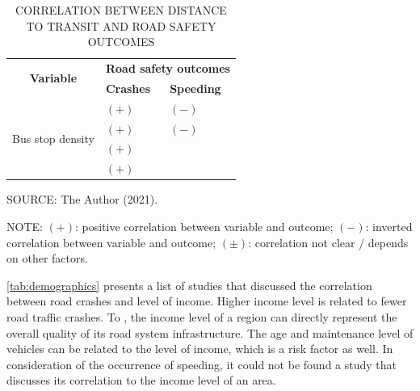 \begin{table}[!hbtp]
    \footnotesize
    \captionsetup{justification=raggedright,
        singlelinecheck=false,
        font=footnotesize}
    \caption{CORRELATION BETWEEN DISTANCE TO TRANSIT AND ROAD SAFETY OUTCOMES}
    \centering
    \begin{tabular}{p{2.5cm}p{6.2cm}p{6.2cm}}
        \hline
        \multicolumn{1}{c}{\multirow{2}{2.5cm}{\textbf{Variable}}} & \multicolumn{2}{c}{\textbf{Road safety outcomes}} \\
        \multicolumn{1}{c}{} & \textbf{Crashes} & \textbf{Speeding} \\ \hline
        \multirow{4}{2.5cm}{Bus stop density}  
         & $(+)$ \textcite{Obelheiro2020} & $(-)$ \textcite{Bansal2014} \\
         & $(+)$ \textcite{Ouyang2014} &  $(-)$ \textcite{Koshy2005} \\
         & $(+)$ \textcite{Wei2013} &  \\ 
         & $(+)$ \textcite{Kim2010} &  \\ \hline
    \end{tabular}
    \label{tab:distance}
    \par \vspace{2mm} \footnotesize \raggedright
    SOURCE: The Author (2021).
    \par \vspace{1mm} \footnotesize \raggedright
    NOTE: $(+)$: positive correlation between variable and outcome; $(-)$: inverted correlation between variable and outcome; $(\pm)$: correlation not clear / depends on other factors.
\end{table}

\autoref{tab:demographics} presents a list of studies that discussed the correlation between road crashes and level of income. Higher income level is related to fewer road traffic crashes. To \textcite{Obelheiro2019}, the income level of a region can directly represent the overall quality of its road system infrastructure. The age and maintenance level of vehicles can be related to the level of income, which is a risk factor as well. In consideration of the occurrence of speeding, it could not be found a study that discusses its correlation to the income level of an area. 

